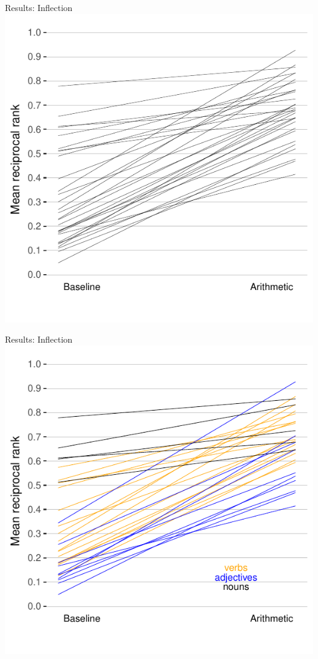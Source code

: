 \documentclass{beamer}
\begin{document}
\begin{frame}{Results: Inflection}
\centering
\includegraphics[scale=.8]{inflectional.pdf}
\end{frame}
\begin{frame}{Results: Inflection}
\centering
\includegraphics[scale=.8]{inflectional3.pdf}
\end{frame}
\end{document}
